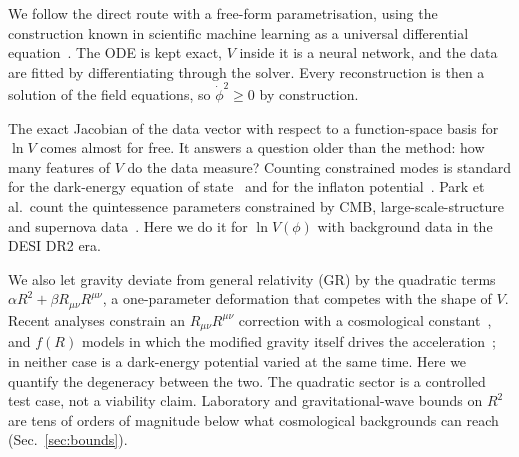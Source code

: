 \documentclass[11pt,a4paper]{article}
\begin{document}
We follow the direct route with a free-form parametrisation, using the construction known in scientific machine learning as a universal differential equation~\cite{2001.04385,1806.07366}. The ODE is kept exact, $V$ inside it is a neural network, and the data are fitted by differentiating through the solver. Every reconstruction is then a solution of the field equations, so $\dot\phi^2\ge0$ by construction.

The exact Jacobian of the data vector with respect to a function-space basis for $\ln V$ comes almost for free. It answers a question older than the method: how many features of $V$ do the data measure? Counting constrained modes is standard for the dark-energy equation of state~\cite{astro-ph_0207517,1004.0236} and for the inflaton potential~\cite{astro-ph_0505158}. Park et al.\ count the quintessence parameters constrained by CMB, large-scale-structure and supernova data~\cite{2101.04666}. Here we do it for $\ln V(\phi)$ with background data in the DESI DR2 era.

We also let gravity deviate from general relativity (GR) by the quadratic terms $\alpha R^2+\beta R_{\mu\nu}R^{\mu\nu}$, a one-parameter deformation that competes with the shape of $V$. Recent analyses constrain an $R_{\mu\nu}R^{\mu\nu}$ correction with a cosmological constant~\cite{2607.22126}, and $f(R)$ models in which the modified gravity itself drives the acceleration~\cite{2305.06392,2112.00822,2609.21912,2511.06924}; in neither case is a dark-energy potential varied at the same time. Here we quantify the degeneracy between the two. The quadratic sector is a controlled test case, not a viability claim. Laboratory and gravitational-wave bounds on $R^2$~\cite{hep-ph_0611184,1104.0819,2611.06902} are tens of orders of magnitude below what cosmological backgrounds can reach (Sec.~\ref{sec:bounds}).
\end{document}
